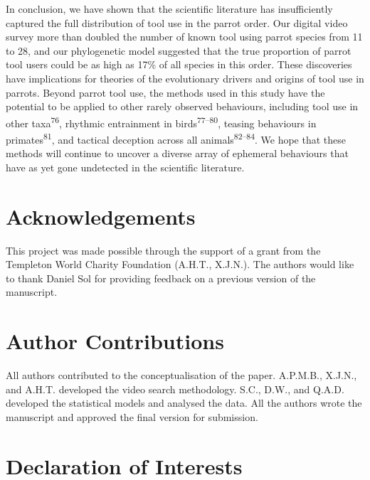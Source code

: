 \documentclass[
  man, donotrepeattitle,floatsintext]{apa6}
\begin{document}
In conclusion, we have shown that the scientific literature has insufficiently
captured the full distribution of tool use in the parrot order. Our
digital video survey more than doubled the number of known tool using parrot
species from 11 to 28, and our phylogenetic model suggested that the true
proportion of parrot tool users could be as high as 17\% of all species in this
order. These discoveries have implications for theories of the evolutionary
drivers and origins of tool use in parrots. Beyond parrot tool use, the
methods used in this study have the potential to be applied to other rarely
observed behaviours, including tool use in other taxa\textsuperscript{76}, rhythmic
entrainment in birds\textsuperscript{77--80},
teasing behaviours in primates\textsuperscript{81}, and tactical deception across all
animals\textsuperscript{82--84}. We hope that these methods
will continue to uncover a diverse array of ephemeral behaviours that have as
yet gone undetected in the scientific literature.

\newpage
\nolinenumbers

\hypertarget{acknowledgements}{%
\section{Acknowledgements}\label{acknowledgements}}

This project was made possible through the support of a grant from the Templeton
World Charity Foundation (A.H.T., X.J.N.). The authors would like to thank
Daniel Sol for providing feedback on a previous version of the manuscript.

\hypertarget{author-contributions}{%
\section{Author Contributions}\label{author-contributions}}

All authors contributed to the conceptualisation of the paper. A.P.M.B., X.J.N.,
and A.H.T. developed the video search methodology. S.C., D.W., and Q.A.D.
developed the statistical models and analysed the data. All the authors wrote
the manuscript and approved the final version for submission.

\hypertarget{declaration-of-interests}{%
\section{Declaration of Interests}\label{declaration-of-interests}}
\end{document}

